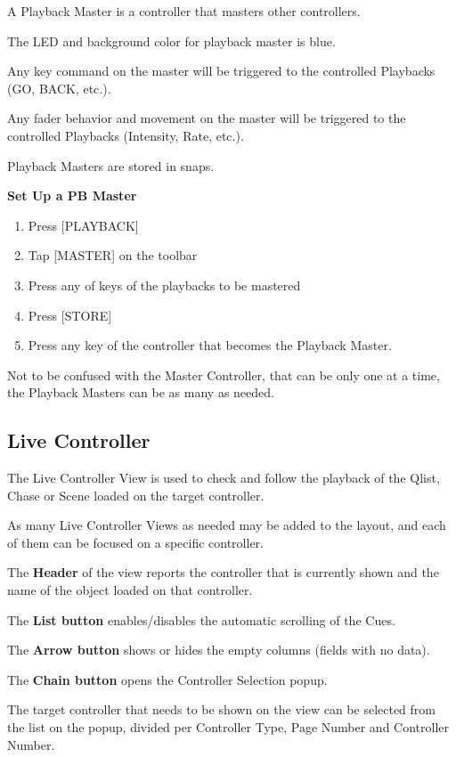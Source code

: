 \documentclass[
]{article}
\begin{document}
A Playback Master is a controller that masters other controllers.

The LED and background color for playback master is blue.

Any key command on the master will be triggered to the controlled Playbacks (GO, BACK, etc.).

Any fader behavior and movement on the master will be triggered to the controlled Playbacks (Intensity, Rate, etc.).

Playback Masters are stored in snaps.

\textbf{Set Up a PB Master}

\begin{enumerate}
\def\labelenumi{\arabic{enumi}.}
\item
  Press {[}PLAYBACK{]}
\item
  Tap {[}MASTER{]} on the toolbar
\item
  Press any of keys of the playbacks to be mastered
\item
  Press {[}STORE{]}
\item
  Press any key of the controller that becomes the Playback Master.
\end{enumerate}

{ Not to be confused with the Master Controller, that can be only one at a time, the Playback Masters can be as many as needed.}

\hypertarget{Live-Controller-11.5}{%
\subsection{Live Controller}\label{Live-Controller-11.5}}

The Live Controller View is used to check and follow the playback of the Qlist, Chase or Scene loaded on the target controller.

As many Live Controller Views as needed may be added to the layout, and each of them can be focused on a specific controller.

The \textbf{Header} of the view reports the controller that is currently shown and the name of the object loaded on that controller.

The \textbf{List button} enables/disables the automatic scrolling of the Cues.

The \textbf{Arrow button} shows or hides the empty columns (fields with no data).

The \textbf{Chain button} opens the Controller Selection popup.

The target controller that needs to be shown on the view can be selected from the list on the popup, divided per Controller Type, Page Number and Controller Number.
\end{document}
